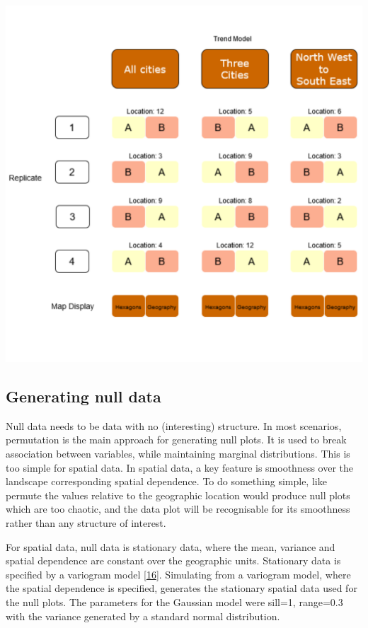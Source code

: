 \documentclass[conference,final,]{IEEEtran}
\makeatletter
\def\maxwidth{\ifdim\Gin@nat@width>\linewidth\linewidth
\else\Gin@nat@width\fi}
\let\Oldincludegraphics\includegraphics
\renewcommand{\includegraphics}[1]{\Oldincludegraphics[width=\maxwidth]{#1}}
\makeatother
\begin{document}
\includegraphics{paper_files/figure-latex/exp-design-1.pdf}

\hypertarget{generating-null-data}{%
\subsection{Generating null data}\label{generating-null-data}}

Null data needs to be data with no (interesting) structure. In most scenarios, permutation is the main approach for generating null plots. It is used to break association between variables, while maintaining marginal distributions. This is too simple for spatial data. In spatial data, a key feature is smoothness over the landscape corresponding spatial dependence. To do something simple, like permute the values relative to the geographic location would produce null plots which are too chaotic, and the data plot will be recognisable for its smoothness rather than any structure of interest.

For spatial data, null data is stationary data, where the mean, variance and spatial dependence are constant over the geographic units. Stationary data is specified by a variogram model {[}\protect\hyperlink{ref-POG}{16}{]}. Simulating from a variogram model, where the spatial dependence is specified, generates the stationary spatial data used for the null plots. The parameters for the Gaussian model were sill=1, range=0.3 with the variance generated by a standard normal distribution.
\end{document}
